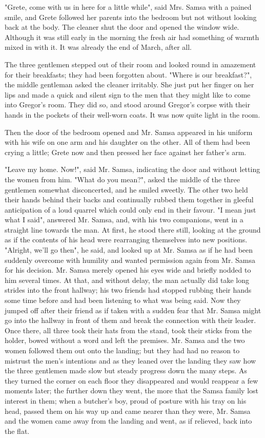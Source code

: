 \documentclass[12pt]{book}
\begin{document}
    "Grete, come with us in here for a little while", said Mrs. Samsa with a pained smile, and Grete followed her parents into the bedroom but not without looking back at the body. The cleaner shut the door and opened the window wide. Although it was still early in the morning the fresh air had something of warmth mixed in with it. It was already the end of March, after all.

    The three gentlemen stepped out of their room and looked round in amazement for their breakfasts; they had been forgotten about. "Where is our breakfast?", the middle gentleman asked the cleaner irritably. She just put her finger on her lips and made a quick and silent sign to the men that they might like to come into Gregor's room. They did so, and stood around Gregor's corpse with their hands in the pockets of their well-worn coats. It was now quite light in the room.

    Then the door of the bedroom opened and Mr. Samsa appeared in his uniform with his wife on one arm and his daughter on the other. All of them had been crying a little; Grete now and then pressed her face against her father's arm.

    "Leave my home. Now!", said Mr. Samsa, indicating the door and without letting the women from him. "What do you mean?", asked the middle of the three gentlemen somewhat disconcerted, and he smiled sweetly. The other two held their hands behind their backs and continually rubbed them together in gleeful anticipation of a loud quarrel which could only end in their favour. "I mean just what I said", answered Mr. Samsa, and, with his two companions, went in a straight line towards the man. At first, he stood there still, looking at the ground as if the contents of his head were rearranging themselves into new positions. "Alright, we'll go then", he said, and looked up at Mr. Samsa as if he had been suddenly overcome with humility and wanted permission again from Mr. Samsa for his decision. Mr. Samsa merely opened his eyes wide and briefly nodded to him several times. At that, and without delay, the man actually did take long strides into the front hallway; his two friends had stopped rubbing their hands some time before and had been listening to what was being said. Now they jumped off after their friend as if taken with a sudden fear that Mr. Samsa might go into the hallway in front of them and break the connection with their leader. Once there, all three took their hats from the stand, took their sticks from the holder, bowed without a word and left the premises. Mr. Samsa and the two women followed them out onto the landing; but they had had no reason to mistrust the men's intentions and as they leaned over the landing they saw how the three gentlemen made slow but steady progress down the many steps. As they turned the corner on each floor they disappeared and would reappear a few moments later; the further down they went, the more that the Samsa family lost interest in them; when a butcher's boy, proud of posture with his tray on his head, passed them on his way up and came nearer than they were, Mr. Samsa and the women came away from the landing and went, as if relieved, back into the flat.
\end{document}
